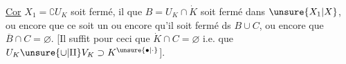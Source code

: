 \uline{Cor}    $X_1=\complement U_K$ soit  fermé, il  que $B=U_K\cap\dot K$ soit    fermé dans $\unsure{X_1|X}$, ou encore que ce soit un     ou encore qu'il soit fermé ds $B\cup C$, ou encore que $\overline B\cap C=\varnothing$. [Il suffit pour ceci que $\dot K\cap C=\varnothing$ i.e. que $U_K\unsure{\cup|\amalg}V_K\supset K^{\unsure{\bullet|\cdot}}$]. 
